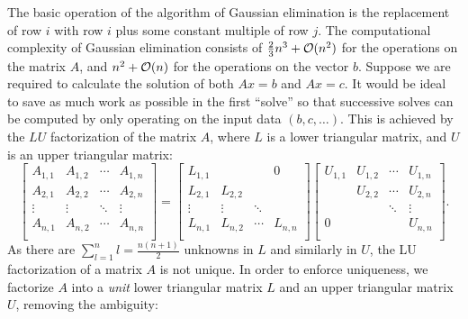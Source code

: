 The basic operation of the algorithm of Gaussian elimination is the replacement of row $i$ with row $i$ plus some constant multiple of row $j$. The computational complexity of Gaussian elimination consists of $\frac{2}{3}n^3+\mathcal{O}(n^2)$ for the operations on the matrix $A$, and $n^2+\mathcal{O}(n)$ for the operations on the vector $b$. Suppose we are required to calculate the solution of both $Ax=b$ and $Ax=c$. It would be ideal to save as much work as possible in the first ``solve'' so that successive solves can be computed by only operating on the input data $(b,c,\ldots)$. This is achieved by the $LU$ factorization of the matrix $A$, where $L$ is a lower triangular matrix, and $U$ is an upper triangular matrix:
\begin{equation}
\begin{bmatrix}
A_{1,1} & A_{1,2} & \cdots & A_{1,n}\\
A_{2,1} & A_{2,2} & \cdots & A_{2,n}\\
\vdots & \vdots & \ddots & \vdots\\
A_{n,1} & A_{n,2} & \cdots & A_{n,n}\\
\end{bmatrix}
=
\begin{bmatrix}
L_{1,1} & & & 0\\
L_{2,1} & L_{2,2}\\
\vdots & \vdots & \ddots\\
L_{n,1} & L_{n,2} & \cdots & L_{n,n}\\
\end{bmatrix}
\begin{bmatrix}
U_{1,1} & U_{1,2} & \cdots & U_{1,n}\\
& U_{2,2} & \cdots & U_{2,n}\\
& & \ddots & \vdots\\
0 & & & U_{n,n}\\
\end{bmatrix}.
\end{equation}
As there are $\displaystyle \sum_{l=1}^n l = \frac{n(n+1)}{2}$ unknowns in $L$ and similarly in $U$, the LU factorization of a matrix $A$ is not unique. In order to enforce uniqueness, we factorize $A$ into a {\em unit} lower triangular matrix $L$ and an upper triangular matrix $U$, removing the ambiguity:
